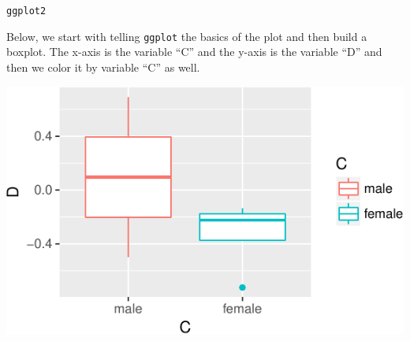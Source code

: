 \begin{frame}[fragile]{\texttt{ggplot2}}

Below, we start with telling \texttt{ggplot} the basics of the plot and
then build a boxplot. The x-axis is the variable ``C'' and the y-axis is
the variable ``D'' and then we color it by variable ``C'' as well.

\begin{Shaded}
\begin{Highlighting}[]
\NormalTok{(}\OperatorTok{+}
\StringTok{  }\NormalTok{(}\NormalTok{(}
\end{Highlighting}
\end{Shaded}

\includegraphics{03_UnderstandData_files/figure-beamer/unnamed-chunk-11-1.pdf}

\end{frame}

